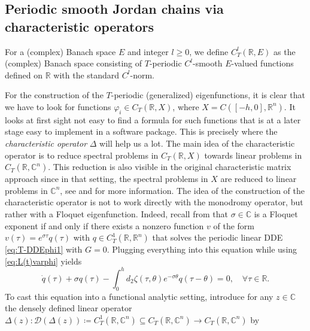 \documentclass[english]{myarticle}
\begin{document}
\begin{sloppypar}
\subsection{Periodic smooth Jordan chains via characteristic operators} \label{subsec: Jordan chains via characteristic operators}
For a (complex) Banach space $E$ and integer $l \geq 0$, we define $C_T^l(\mathbb{R},E)$ as the (complex) Banach space consisting of $T$-periodic $C^l$-smooth $E$-valued functions defined on $\mathbb{R}$ with the standard $C^l$-norm. 

For the construction of the $T$-periodic (generalized) eigenfunctions, it is clear that we have to look for functions $\varphi_i \in C_T(\mathbb{R},X)$, where $X = C([-h,0],\mathbb{R}^n)$. It looks at first sight not easy to find a formula for such functions that is at a later stage easy to implement in a software package. This is precisely where the \emph{characteristic operator} $\Delta$ will help us a lot. The main idea of the characteristic operator is to reduce spectral problems in $C_T(\mathbb{R},X)$ towards linear problems in $C_T(\mathbb{R},\mathbb{C}^n)$. This reduction is also visible in the original characteristic matrix approach since in that setting, the spectral problems in $X$ are reduced to linear problems in $\mathbb{C}^n$, see \cite[Section IV.4]{Diekmann1995} and \cite[Section II.1]{Kaashoek1992} for more information. The idea of the construction of the characteristic operator is not to work directly with the monodromy operator, but rather with a Floquet eigenfunction. Indeed, recall from \cite[Lemma 8.1.2]{Hale1993} that $\sigma \in \mathbb{C}$ is a Floquet exponent if and only if there exists a nonzero function $v$ of the form $v(\tau) = e^{\sigma \tau}q(\tau)$ with $q \in C_T^1(\mathbb{R},\mathbb{R}^n)$ that solves the periodic linear DDE \eqref{eq:T-DDEphi1} with $G = 0$. Plugging everything into this equation while using \eqref{eq:L(t)varphi} yields
\begin{equation} \label{eq:motivationcharac}
    \dot{q}(\tau) + \sigma q(\tau) - \int_0^h d_2 \zeta (\tau,\theta) e^{-\sigma \theta} q(\tau-\theta) = 0, \quad \forall \tau \in \mathbb{R}.
\end{equation}
To cast this equation into a functional analytic setting, introduce for any $z \in \mathbb{C}$ the densely defined linear operator $\Delta(z) : \mathcal{D}(\Delta(z)) \coloneqq C_T^1(\mathbb{R},\mathbb{C}^n) \subseteq C_T(\mathbb{R},\mathbb{C}^n) \to C_T(\mathbb{R},\mathbb{C}^n)$ by
\begin{equation} \label{eq:Delta(z)q}

\end{equation}
\end{sloppypar}
\end{document}
